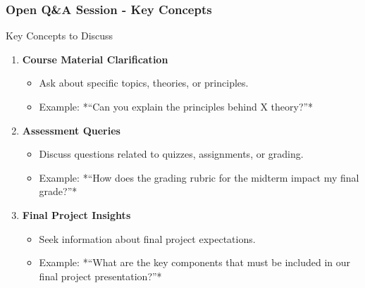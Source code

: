 \documentclass[aspectratio=169]{beamer}
\begin{document}
\begin{frame}[fragile]
    \frametitle{Open Q\&A Session - Key Concepts}
    \begin{block}{Key Concepts to Discuss}
        \begin{enumerate}
            \item \textbf{Course Material Clarification}
                \begin{itemize}
                    \item Ask about specific topics, theories, or principles.
                    \item Example: *“Can you explain the principles behind X theory?”*
                \end{itemize}
                
            \item \textbf{Assessment Queries}
                \begin{itemize}
                    \item Discuss questions related to quizzes, assignments, or grading.
                    \item Example: *“How does the grading rubric for the midterm impact my final grade?”*
                \end{itemize}
                
            \item \textbf{Final Project Insights}
                \begin{itemize}
                    \item Seek information about final project expectations.
                    \item Example: *“What are the key components that must be included in our final project presentation?”*
                \end{itemize}
        \end{enumerate}
    \end{block}
\end{frame}
\end{document}
